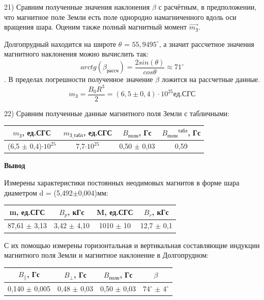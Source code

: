 \documentclass[a4paper,12pt]{article}
\begin{document}
21) Сравним полученные значения наклонения $\beta$ с расчётным, в предположении, что магнитное поле Земли есть поле однородно намагниченного вдоль оси вращения шара. Оценим также полный магнитный момент $\vec{m_{З}}$. 

Долгопрудный находится на широте $\theta$ = $55,9495^{\circ}$, а значит рассчетное значения магнитного наклонения можно вычислить так:
$$ arctg(\beta_{рассч}) = \frac{2sin(\theta)}{cos{\theta}} \approx 71^{\circ}$$. В пределах погрешности полученное значение $\beta$ ложится на рассчетные данные. 
$$ m_{З} = \frac{B_0R^3}{2} = (6,5 \pm 0,4)\cdot10^{25} \text{ед.СГС}$$  

22) Сравним полученные данные магнитного поля Земли с табличными: 

\begin{center}
\begin{tabular}{|c|c|c|c|}
	\hline
	$m_{З}$, ед.СГС & $m_{\text{З\_табл}}$, ед.СГС & $B_{\text{полн}}$, Гс & ${B_{\text{полн}}}^{\text{табл}}$, Гс\\
	\hline
	(6,5 $\pm$ 0,4)$\cdot 10^{25}$ & 7,7$\cdot10^{25}$ & 0,50 $\pm$ 0,03 & 0,59 \\
	\hline
\end{tabular}
\end{center}

\textbf{Вывод}

Измерены характеристики постоянных неодимовых магнитов в форме шара диаметром d = (5,492$\pm$0,004)мм: 
\begin{center}
\begin{tabular}{|c|c|c|c|}
	\hline
	m, ед.СГС & $B_p$, кГс & M, ед.СГС & $B_r$, кГс \\
	\hline
	87,61 $\pm$ 3,13 & 3,42 $\pm$ 4,10 & 1010 $\pm$ 10 & 12,7 $\pm$ 0,1 \\
	\hline
\end{tabular}
\end{center}


С их помощью измерены горизонтальная и вертикальная составляющие индукции магнитного поля Земли и магнитное наклонение в Долгопрудном:

\begin{center}
 \begin{tabular}{|c|c|c|c|}
     \hline
     $B_{||}$, Гс & $B_{\perp}$, Гс & $B_{\text{полн}}$, Гс & $\beta$ \\
     \hline
     0,140 $\pm$ 0,005 & 0,48 $\pm$ 0,03 & 0,50 $\pm$ 0,03 & $74^{\circ}$ $\pm$ $4^{\circ}$\\
     \hline
 \end{tabular}
 \end{center}
	
\end{document}
